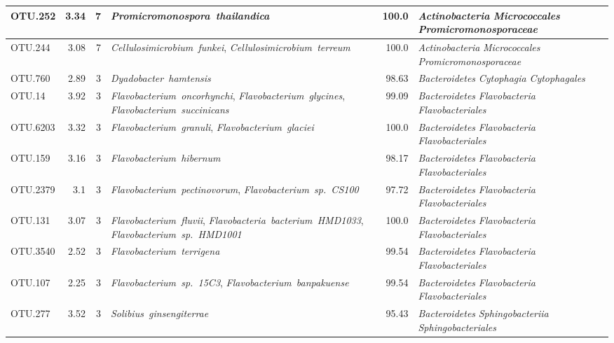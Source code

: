 \begin{longtable}{lrrP{5cm}rP{5cm}}
OTU.252 & 3.34 & 7 & \mbox{\textit{Promicromonospora thailandica}} & 100.0 & \mbox{\textit{Actinobacteria}} \mbox{\textit{Micrococcales}} \mbox{\textit{Promicromonosporaceae}} \\ \midrule
OTU.244 & 3.08 & 7 & \mbox{\textit{Cellulosimicrobium funkei}}, \mbox{\textit{Cellulosimicrobium terreum}} & 100.0 & \mbox{\textit{Actinobacteria}} \mbox{\textit{Micrococcales}} \mbox{\textit{Promicromonosporaceae}} \\ \midrule
OTU.760 & 2.89 & 3 & \mbox{\textit{Dyadobacter hamtensis}} & 98.63 & \mbox{\textit{Bacteroidetes}} \mbox{\textit{Cytophagia}} \mbox{\textit{Cytophagales}} \\ \midrule
OTU.14 & 3.92 & 3 & \mbox{\textit{Flavobacterium oncorhynchi}}, \mbox{\textit{Flavobacterium glycines}}, \mbox{\textit{Flavobacterium succinicans}} & 99.09 & \mbox{\textit{Bacteroidetes}} \mbox{\textit{Flavobacteria}} \mbox{\textit{Flavobacteriales}} \\ \midrule
OTU.6203 & 3.32 & 3 & \mbox{\textit{Flavobacterium granuli}}, \mbox{\textit{Flavobacterium glaciei}} & 100.0 & \mbox{\textit{Bacteroidetes}} \mbox{\textit{Flavobacteria}} \mbox{\textit{Flavobacteriales}} \\ \midrule
OTU.159 & 3.16 & 3 & \mbox{\textit{Flavobacterium hibernum}} & 98.17 & \mbox{\textit{Bacteroidetes}} \mbox{\textit{Flavobacteria}} \mbox{\textit{Flavobacteriales}} \\ \midrule
OTU.2379 & 3.1 & 3 & \mbox{\textit{Flavobacterium pectinovorum}}, \mbox{\textit{Flavobacterium sp. CS100}} & 97.72 & \mbox{\textit{Bacteroidetes}} \mbox{\textit{Flavobacteria}} \mbox{\textit{Flavobacteriales}} \\ \midrule
OTU.131 & 3.07 & 3 & \mbox{\textit{Flavobacterium fluvii}}, \mbox{\textit{Flavobacteria bacterium HMD1033}}, \mbox{\textit{Flavobacterium sp. HMD1001}} & 100.0 & \mbox{\textit{Bacteroidetes}} \mbox{\textit{Flavobacteria}} \mbox{\textit{Flavobacteriales}} \\ \midrule
OTU.3540 & 2.52 & 3 & \mbox{\textit{Flavobacterium terrigena}} & 99.54 & \mbox{\textit{Bacteroidetes}} \mbox{\textit{Flavobacteria}} \mbox{\textit{Flavobacteriales}} \\ \midrule
OTU.107 & 2.25 & 3 & \mbox{\textit{Flavobacterium sp. 15C3}}, \mbox{\textit{Flavobacterium banpakuense}} & 99.54 & \mbox{\textit{Bacteroidetes}} \mbox{\textit{Flavobacteria}} \mbox{\textit{Flavobacteriales}} \\ \midrule
OTU.277 & 3.52 & 3 & \mbox{\textit{Solibius ginsengiterrae}} & 95.43 & \mbox{\textit{Bacteroidetes}} \mbox{\textit{Sphingobacteriia}} \mbox{\textit{Sphingobacteriales}} \\ \midrule

\end{longtable}
